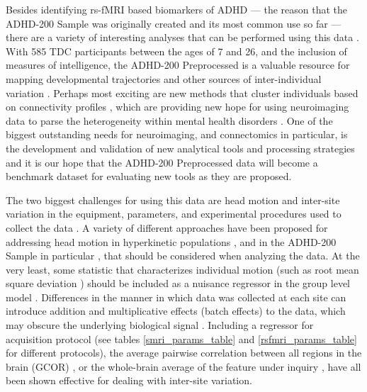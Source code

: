 \documentclass[preprint,12pt,3p]{elsarticle}
\begin{document}
Besides identifying rs-fMRI based biomarkers of ADHD --- the reason that the ADHD-200 Sample was originally created and its most common use so far --- there are a variety of interesting analyses that can be performed using this data \cite{craddock2015}. With 585 TDC participants between the ages of 7 and 26, and the inclusion of measures of intelligence, the ADHD-200 Preprocessed is a valuable resource for mapping developmental trajectories \cite{dosenbach2010, zuo2010, dimartino2014} and other sources of inter-individual variation \cite{kelly2012}. Perhaps most exciting are new methods that cluster individuals based on connectivity profiles \cite{miranda2014connectotyping, finn2015fingerprinting}, which are providing new hope for using neuroimaging data to parse the heterogeneity within mental health disorders \cite{castellanos2013}. One of the biggest outstanding needs for neuroimaging, and connectomics in particular, is the development and validation of new analytical tools and processing strategies \cite{craddock2013,varoquaux2013,craddock2015} and it is our hope that the ADHD-200 Preprocessed data will become a benchmark dataset for evaluating new tools as they are proposed.

The two biggest challenges for using this data are head motion \cite{power2012, vandijk2012, sattertwhaite2012, fair2012ADHD-200, yan2013motion, yan2013small} and inter-site variation in the equipment, parameters, and experimental procedures used to collect the data \cite{Olivetti2012,yan2013std}. A variety of different approaches have been proposed for addressing head motion in hyperkinetic populations \cite{power2012, sattertwhaite2013}, and in the ADHD-200 Sample in particular \cite{fair2012ADHD-200}, that should be considered when analyzing the data. At the very least, some statistic that characterizes individual motion (such as root mean square deviation \cite{JenkinsonTR99}) should be included as a nuisance regressor in the group level model \cite{sattertwhaite2012, yan2013motion}. Differences in the manner in which data was collected at each site can introduce addition and multiplicative effects (batch effects) to the data, which may obscure the underlying biological signal \cite{Olivetti2012,yan2013std}. Including a regressor for acquisition protocol (see tables \ref{smri_params_table} and \ref{rsfmri_params_table} for different protocols), the average pairwise correlation between all regions in the brain (GCOR) \cite{saad2013gcor}, or the whole-brain average of the feature under inquiry \cite{yan2013std}, have all been shown effective for dealing with inter-site variation. 
\end{document}

